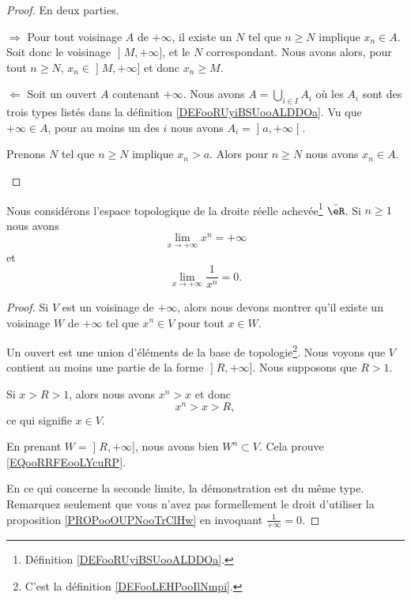 \begin{proof}
    En deux parties.
    \begin{subproof}
        \item[\( \Rightarrow\)]
            Pour tout voisinage \( A\) de \( +\infty\), il existe un \( N\) tel que \( n\geq N\) implique \( x_n\in A\). Soit donc le voisinage \( \mathopen] M , +\infty \mathclose]\), et le \( N\) correspondant. Nous avons alors, pour tout \( n\geq N\), \( x_n\in \mathopen] M , +\infty \mathclose]\) et donc \( x_n\geq M\).
        \item[\( \Leftarrow\)]
        Soit un ouvert \( A\) contenant \( +\infty\). Nous avons \( A=\bigcup_{i\in I} A_i\) où les \( A_i\) sont des trois types listés dans la définition \ref{DEFooRUyiBSUooALDDOa}. Vu que \( +\infty\in A\), pour au moins un des \( i\) nous avons \( A_i=\mathopen] a , +\infty \mathclose[\).

            Prenons \( N\) tel que \( n\geq N\) implique \( x_n>a\). Alors pour \( n\geq N\) nous avons \( x_n\in A\).
    \end{subproof}
\end{proof}

\begin{lemma}       \label{LEMooFCIXooJuHFqk}
    Nous considérons l'espace topologique de la droite réelle achevée\footnote{Définition \ref{DEFooRUyiBSUooALDDOa}.} \( \bar \eR\). Si \( n\geq 1\) nous avons 
    \begin{equation}        \label{EQooRRFEooLYcuRP}
        \lim_{x\to +\infty} x^n = +\infty
    \end{equation}
    et
    \begin{equation}
        \lim_{x\to +\infty} \frac{1}{ x^n }=0.
    \end{equation}
\end{lemma}

\begin{proof}
    Si \( V\) est un voisinage de \( +\infty\), alors nous devons montrer qu'il existe un voisinage \( W\) de \( +\infty\) tel que \( x^n\in V\) pour tout \( x\in W\).   

    Un ouvert est une union d'éléments de la base de topologie\footnote{C'est la définition \ref{DEFooLEHPooIlNmpi}.}. Nous voyons que \( V\) contient au moins une partie de la forme \( \mathopen] R , +\infty \mathclose]\). Nous supposons que \( R>1\).

    Si \( x>R>1\), alors nous avons \( x^n>x\) et donc
    \begin{equation}
        x^n> x>R,
    \end{equation}
    ce qui signifie \( x\in V\).

    En prenant \( W=\mathopen] R , +\infty \mathclose]\), nous avons bien \( W^n\subset V\). Cela prouve \eqref{EQooRRFEooLYcuRP}.

    En ce qui concerne la seconde limite, la démonstration est du même type. Remarquez seulement que vous n'avez pas formellement le droit d'utiliser la proposition \ref{PROPooOUPNooTrClHw} en invoquant \( \frac{1}{ +\infty }=0\).
\end{proof}

